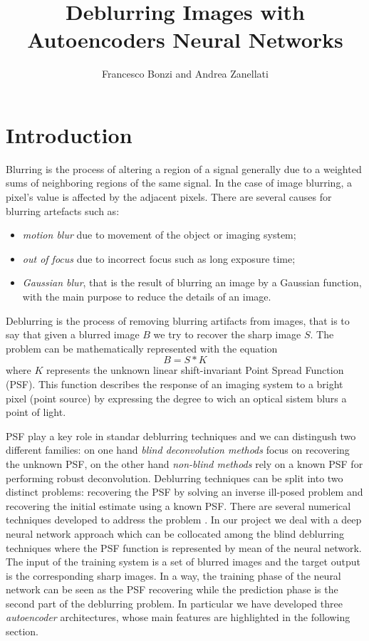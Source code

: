 \documentclass[12pt,a4paper]{report}
\title{Deblurring Images with Autoencoders Neural Networks}
\author{Francesco Bonzi and Andrea Zanellati}
\date{}
\begin{document}
\maketitle
\newpage
\tableofcontents
\newpage

\section*{Introduction}
Blurring is the process of altering a region of a signal generally due to  a weighted sums of neighboring regions of the same signal. In the case of image blurring, a pixel’s value is affected by the adjacent pixels. There are several causes for blurring artefacts such as\cite {P&V&G}: 
\begin{itemize}
\item \textit{motion blur} due to movement of the object or imaging system;
\item \textit{out of focus} due to incorrect focus such as long exposure time;
\item \textit{Gaussian blur}, that is the result of blurring an image by a Gaussian function, with the main purpose to reduce the details of an image.
\end{itemize}

Deblurring is the process of removing blurring artifacts from images, that is to say that given a blurred image $B$ we try to recover the sharp image $S$. The problem can be mathematically represented with the equation \begin{equation} B = S * K \end{equation} where $K$ represents the unknown linear shift-invariant Point Spread Function (PSF). This function describes the response of an imaging system to a bright pixel (point source) by expressing the degree to wich an optical sistem blurs a point of light.

PSF play a key role in standar deblurring techniques and we can distingush two different families: on one hand \textit{blind deconvolution methods} focus on recovering the unknown PSF, on the other hand \textit{non-blind methods} rely on a known PSF for performing robust deconvolution. Deblurring techniques can be split into two distinct problems: recovering the PSF by solving an inverse ill-posed problem and recovering the initial estimate using a known PSF. There are several numerical techniques developed to address the problem \cite{H&Al}. In our project we deal with a deep neural network approach which can be collocated among the blind deblurring techniques where the PSF function is represented by mean of the neural network. The input of the training system is a set of blurred images and the target output is the corresponding sharp images. In a way, the training phase of the neural network can be seen as the  PSF recovering while the prediction phase is the second part of the deblurring problem. In particular we have developed three \textit{autoencoder} architectures, whose main features are highlighted in the following section. 
\end{document}
